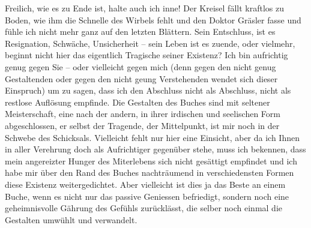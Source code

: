 \pstart
           Freilich, wie es zu Ende ist, halte auch ich inne! Der Kreisel fällt kraftlos zu
               Boden, wie ihm die Schnelle des Wirbels fehlt und den Doktor Gräsler fasse und fühle ich nicht mehr ganz auf den
               letzten Blättern. Sein Entschluss, ist es Resignation, Schwäche, Unsicherheit – sein
               Leben ist es zuende, oder vielmehr, beginnt nicht hier das eigentlich Tragische
               seiner Existenz? Ich bin aufrichtig genug gegen Sie – oder vielleicht gegen mich
               (denn gegen den nicht genug Gestaltenden oder gegen den nicht geung Verstehenden
               wendet sich dieser Einspruch) um zu sagen, dass ich den Abschluss nicht als
               Abschluss, nicht als restlose Auflösung empfinde. Die Gestalten des Buches sind mit
               seltener Meisterschaft, eine nach der andern, in ihrer irdischen und seelischen Form
               abgeschlossen, {\pb}er selbst der Tragende,
               der Mittelpunkt, ist mir noch in der Schwebe des Schicksals. Vielleicht fehlt nur
               hier eine Einsicht, aber da ich Ihnen in aller Verehrung doch als Aufrichtiger
               gegenüber stehe, muss ich bekennen, dass mein angereizter Hunger des Miterlebens sich
               nicht gesättigt empfindet und ich habe mir über den Rand des Buches nachträumend in verschiedensten
               Formen diese Existenz weitergedichtet. Aber vielleicht ist dies ja das Beste an einem
               Buche, wenn es nicht nur das passive Geniessen befriedigt, sondern noch eine
               geheimnisvolle Gährung des Gefühls zurücklässt, die selber noch einmal die Gestalten
               umwühlt und verwandelt.\pend
           
